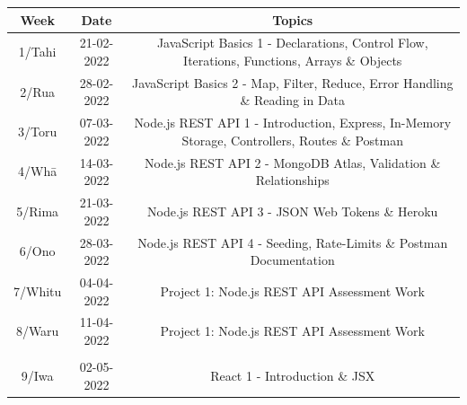 \documentclass{article}
\begin{document}
\renewcommand{\arraystretch}{1.5}
\begin{tabular}{|c|c|c|c|}
	\hline
	\textbf{Week}                  & \textbf{Date}            & \multicolumn{2}{c|}{\textbf{Topics}}                                                                                             \\ \hline
	\footnotesize 1/Tahi           & \footnotesize 21-02-2022 & \multicolumn{2}{c|}{\footnotesize JavaScript Basics 1 - Declarations, Control Flow, Iterations, Functions, Arrays \& Objects}    \\ \hline
	\footnotesize 2/Rua            & \footnotesize 28-02-2022 & \multicolumn{2}{c|}{\footnotesize JavaScript Basics 2 - Map, Filter, Reduce, Error Handling \& Reading in Data}                  \\ \hline
	\footnotesize 3/Toru           & \footnotesize 07-03-2022 & \multicolumn{2}{c|}{\footnotesize Node.js REST API 1 - Introduction, Express, In-Memory Storage, Controllers, Routes \& Postman} \\ \hline
	\footnotesize 4/Whā            & \footnotesize 14-03-2022 & \multicolumn{2}{c|}{\footnotesize Node.js REST API 2 - MongoDB Atlas, Validation \& Relationships}                               \\ \hline
	\footnotesize 5/Rima           & \footnotesize 21-03-2022 & \multicolumn{2}{c|}{\footnotesize Node.js REST API 3 - JSON Web Tokens \& Heroku}                                                \\ \hline
	\footnotesize 6/Ono            & \footnotesize 28-03-2022 & \multicolumn{2}{c|}{\footnotesize Node.js REST API 4 - Seeding, Rate-Limits \& Postman Documentation}                            \\ \hline
	\footnotesize 7/Whitu          & \footnotesize 04-04-2022 & \multicolumn{2}{c|}{\footnotesize Project 1: Node.js REST API Assessment Work}                                                   \\ \hline
	\footnotesize 8/Waru           & \footnotesize 11-04-2022 & \multicolumn{2}{c|}{\footnotesize Project 1: Node.js REST API Assessment Work}                                                   \\ \hline
	\rowcolor{yellow} \multicolumn{4}{|c|}{\footnotesize Mid Term Break}                                                                                                                         \\ \hline
	\footnotesize 9/Iwa            & \footnotesize 02-05-2022 & \multicolumn{2}{c|}{\footnotesize React 1 - Introduction \& JSX}                                                                 \\ \hline

\end{tabular}
\end{document}
